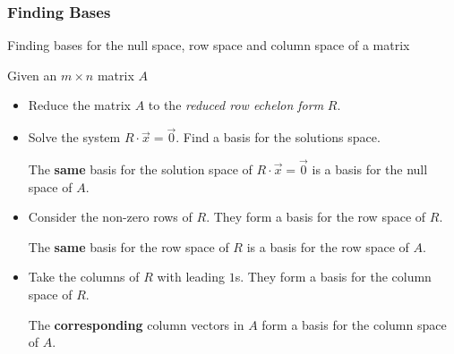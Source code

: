 \begin{frame}[fragile]
\frametitle{Finding Bases}

Finding bases for the null space, row space and column space of a matrix


Given an $m \times n$ matrix $A$

\begin{itemize}

\item Reduce the matrix $A$ to the {\em reduced row echelon form} $R$.



\item Solve the system $R \cdot \vec{x} = \vec{0}$. Find a basis for the solutions space.

 The \textbf{same} basis for the solution space of $R \cdot \vec{x} = \vec{0}$ is a basis for the null space of $A$.
 


\item Consider the non-zero rows of $R$. They form a basis for the row space of $R$.

The \textbf{same} basis for the row space of $R$ is a basis for the row space of $A$.



\item Take the columns of $R$ with leading $1$s. They form a basis for the column space of $R$.

The \textbf{corresponding} column vectors in $A$  form a basis for the column space of $A$.

\end{itemize}

\end{frame}

